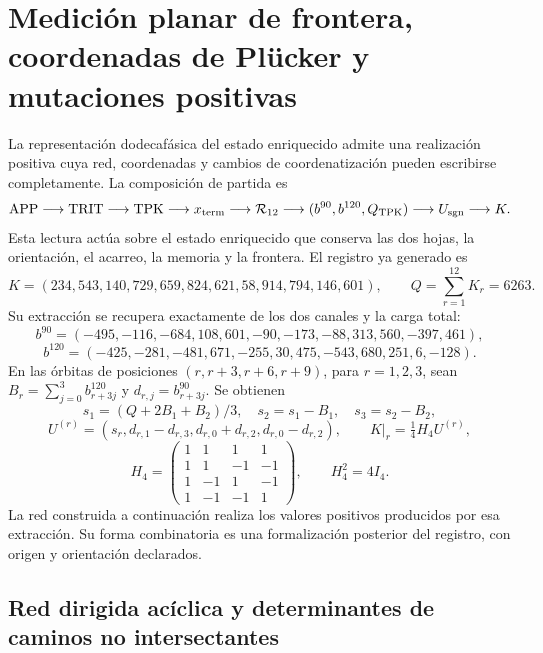 \section{Medición planar de frontera, coordenadas de Plücker y mutaciones positivas}
\label{app:network-cluster}

La representación dodecafásica del estado enriquecido admite una realización
positiva cuya red, coordenadas y cambios de coordenatización pueden escribirse
completamente. La composición de partida es
\[
 \mathrm{APP}\longrightarrow\mathrm{TRIT}\longrightarrow\mathrm{TPK}
 \longrightarrow x_{\rm term}\longrightarrow\mathcal R_{12}
 \longrightarrow(b^{90},b^{120},Q_{\rm TPK})
 \longrightarrow U_{\rm sgn}\longrightarrow K.
\]
Esta lectura actúa sobre el estado enriquecido que conserva las dos hojas,
la orientación, el acarreo, la memoria y la frontera. El registro ya generado
es
\[
 K=(234,543,140,729,659,824,621,58,914,794,146,601),
 \qquad Q=\sum_{r=1}^{12}K_r=6263.
\]
Su extracción se recupera exactamente de los dos canales y la carga total:
\[
 b^{90}=(-495,-116,-684,108,601,-90,-173,-88,313,560,-397,461),
\]
\[
 b^{120}=(-425,-281,-481,671,-255,30,475,-543,680,251,6,-128).
\]
En las órbitas de posiciones \((r,r+3,r+6,r+9)\), para \(r=1,2,3\),
sean \(B_r=\sum_{j=0}^3b^{120}_{r+3j}\) y
\(d_{r,j}=b^{90}_{r+3j}\). Se obtienen
\[
 s_1=(Q+2B_1+B_2)/3,\quad s_2=s_1-B_1,\quad s_3=s_2-B_2,
\]
\[
 U^{(r)}=(s_r,d_{r,1}-d_{r,3},d_{r,0}+d_{r,2},d_{r,0}-d_{r,2}),
 \qquad K|_r=\tfrac14H_4U^{(r)},
\]
\[
 H_4=\begin{pmatrix}1&1&1&1\\1&1&-1&-1\\1&-1&1&-1\\1&-1&-1&1\end{pmatrix},
 \qquad H_4^2=4I_4.
\]
La red construida a continuación realiza los valores positivos producidos
por esa extracción. Su forma combinatoria es una formalización posterior
del registro, con origen y orientación declarados.

\subsection{Red dirigida acíclica y determinantes de caminos no intersectantes}

